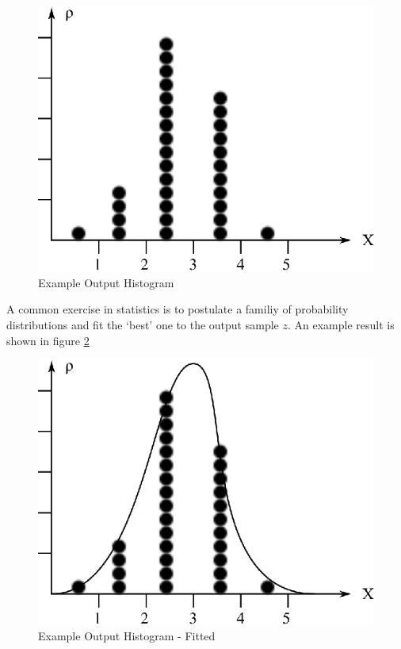 \begin{figure}
  \centering
  \includegraphics{Images/SkewedNormalHistogram.eps}
  \caption[Example Output Histogram]
          {Example Output Histogram}
  \label{fig:SkewedNormalHistogram}
\end{figure}

A common exercise in statistics  is to postulate a familiy of probability distributions and fit the `best' one to the output sample $z$. An example result is shown in figure \ref{fig:SkewedNormalFitted}

\begin{figure}
  \centering
  \includegraphics{Images/SkewedNormalFitted.eps}
  \caption[Example Output Histogram - Fitted]
          {Example Output Histogram - Fitted}
  \label{fig:SkewedNormalFitted}
\end{figure}

